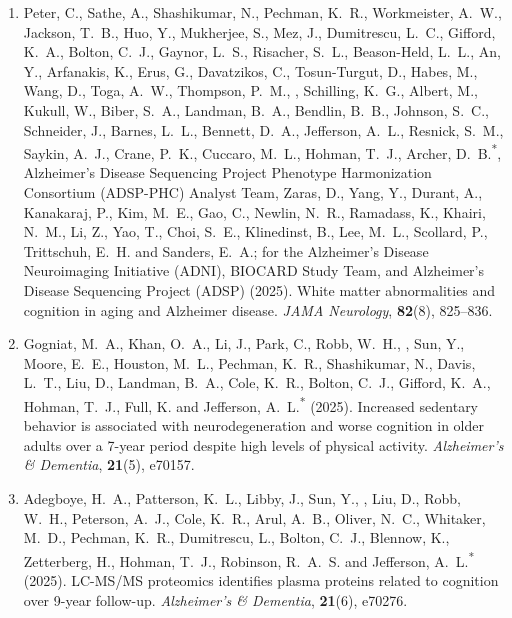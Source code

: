 \begin{enumerate}[resume=journalpubs]
\begin{pubentry}
\par\end{pubentry}
\item\begin{pubentry} Peter, C., Sathe, A., Shashikumar, N., Pechman, K.\ R., Workmeister, A.\ W., Jackson, T.\ B., Huo, Y., Mukherjee, S., Mez, J., Dumitrescu, L.\ C., Gifford, K.\ A., Bolton, C.\ J., Gaynor, L.\ S., Risacher, S.\ L., Beason-Held, L.\ L., An, Y., Arfanakis, K., Erus, G., Davatzikos, C., Tosun-Turgut, D., Habes, M., Wang, D., Toga, A.\ W., Thompson, P.\ M., \PZnot{}, Schilling, K.\ G., Albert, M., Kukull, W., Biber, S.\ A., Landman, B.\ A., Bendlin, B.\ B., Johnson, S.\ C., Schneider, J., Barnes, L.\ L., Bennett, D.\ A., Jefferson, A.\ L., Resnick, S.\ M., Saykin, A.\ J., Crane, P.\ K., Cuccaro, M.\ L., Hohman, T.\ J., Archer, D.\ B.\textsuperscript{*}, Alzheimer's Disease Sequencing Project Phenotype Harmonization Consortium (ADSP-PHC) Analyst Team, Zaras, D., Yang, Y., Durant, A., Kanakaraj, P., Kim, M.\ E., Gao, C., Newlin, N.\ R., Ramadass, K., Khairi, N.\ M., Li, Z., Yao, T., Choi, S.\ E., Klinedinst, B., Lee, M.\ L., Scollard, P., Trittschuh, E.\ H. and Sanders, E.\ A.; for the Alzheimer's Disease Neuroimaging Initiative (ADNI), BIOCARD Study Team, and Alzheimer's Disease Sequencing Project (ADSP) (2025). White matter abnormalities and cognition in aging and Alzheimer disease. \emph{JAMA Neurology}, \textbf{82}(8), 825--836.

\par\end{pubentry}
\item\begin{pubentry} Gogniat, M.\ A., Khan, O.\ A., Li, J., Park, C., Robb, W.\ H., \PZnot{}, Sun, Y., Moore, E.\ E., Houston, M.\ L., Pechman, K.\ R., Shashikumar, N., Davis, L.\ T., Liu, D., Landman, B.\ A., Cole, K.\ R., Bolton, C.\ J., Gifford, K.\ A., Hohman, T.\ J., Full, K. and Jefferson, A.\ L.\textsuperscript{*} (2025). Increased sedentary behavior is associated with neurodegeneration and worse cognition in older adults over a 7-year period despite high levels of physical activity. \emph{Alzheimer's \& Dementia}, \textbf{21}(5), e70157.

\par\end{pubentry}
\item\begin{pubentry} Adegboye, H.\ A., Patterson, K.\ L., Libby, J., Sun, Y., \PZnot{}, Liu, D., Robb, W.\ H., Peterson, A.\ J., Cole, K.\ R., Arul, A.\ B., Oliver, N.\ C., Whitaker, M.\ D., Pechman, K.\ R., Dumitrescu, L., Bolton, C.\ J., Blennow, K., Zetterberg, H., Hohman, T.\ J., Robinson, R.\ A.\ S. and Jefferson, A.\ L.\textsuperscript{*} (2025). LC-MS/MS proteomics identifies plasma proteins related to cognition over 9-year follow-up. \emph{Alzheimer's \& Dementia}, \textbf{21}(6), e70276.


\end{pubentry}
\end{enumerate}
